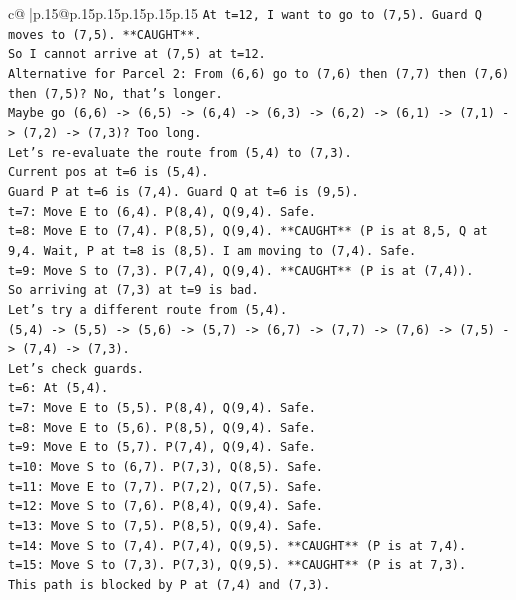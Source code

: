 \documentclass{article}
\begin{document}
{\begin{supertabular}{c@{$\;$}|p{.15\linewidth}@{}p{.15\linewidth}p{.15\linewidth}p{.15\linewidth}p{.15\linewidth}p{.15\linewidth}}
{{{\texttt{At t=12, I want to go to (7,5). Guard Q moves to (7,5). **CAUGHT**.} \\
\texttt{So I cannot arrive at (7,5) at t=12.} \\
\texttt{Alternative for Parcel 2: From (6,6) go to (7,6) then (7,7) then (7,6) then (7,5)? No, that's longer.} \\
\texttt{Maybe go (6,6) {-}> (6,5) {-}> (6,4) {-}> (6,3) {-}> (6,2) {-}> (6,1) {-}> (7,1) {-}> (7,2) {-}> (7,3)? Too long.} \\
\texttt{Let's re{-}evaluate the route from (5,4) to (7,3).} \\
\texttt{Current pos at t=6 is (5,4).} \\
\texttt{Guard P at t=6 is (7,4). Guard Q at t=6 is (9,5).} \\
\texttt{t=7: Move E to (6,4). P(8,4), Q(9,4). Safe.} \\
\texttt{t=8: Move E to (7,4). P(8,5), Q(9,4). **CAUGHT** (P is at 8,5, Q at 9,4. Wait, P at t=8 is (8,5). I am moving to (7,4). Safe.} \\
\texttt{t=9: Move S to (7,3). P(7,4), Q(9,4). **CAUGHT** (P is at (7,4)).} \\
\texttt{So arriving at (7,3) at t=9 is bad.} \\
\texttt{Let's try a different route from (5,4).} \\
\texttt{(5,4) {-}> (5,5) {-}> (5,6) {-}> (5,7) {-}> (6,7) {-}> (7,7) {-}> (7,6) {-}> (7,5) {-}> (7,4) {-}> (7,3).} \\
\texttt{Let's check guards.} \\
\texttt{t=6: At (5,4).} \\
\texttt{t=7: Move E to (5,5). P(8,4), Q(9,4). Safe.} \\
\texttt{t=8: Move E to (5,6). P(8,5), Q(9,4). Safe.} \\
\texttt{t=9: Move E to (5,7). P(7,4), Q(9,4). Safe.} \\
\texttt{t=10: Move S to (6,7). P(7,3), Q(8,5). Safe.} \\
\texttt{t=11: Move E to (7,7). P(7,2), Q(7,5). Safe.} \\
\texttt{t=12: Move S to (7,6). P(8,4), Q(9,4). Safe.} \\
\texttt{t=13: Move S to (7,5). P(8,5), Q(9,4). Safe.} \\
\texttt{t=14: Move S to (7,4). P(7,4), Q(9,5). **CAUGHT** (P is at 7,4).} \\
\texttt{t=15: Move S to (7,3). P(7,3), Q(9,5). **CAUGHT** (P is at 7,3).} \\
\texttt{This path is blocked by P at (7,4) and (7,3).} \\
}}}
\end{supertabular}}
\end{document}
